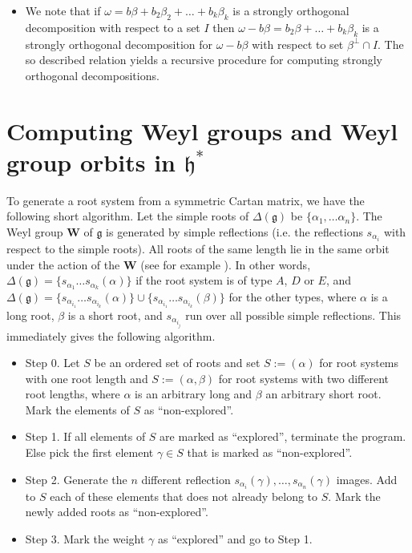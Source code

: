 \documentclass[12pt]{report}
\newcommand{\WW}{\mathbf{W}}
\newcommand{\hh}{\mathfrak{h}}
\newcommand{\gG}{\mathfrak{g}}
\begin{document}
\begin{itemize}
\begin{itemize}
\item We note that if $\omega=b\beta+b_2\beta_2+\dots+b_k\beta_k$ is a strongly orthogonal decomposition with respect to a set $I$ then $\omega-b\beta=b_2\beta+\dots+b_k\beta_k$ is a strongly orthogonal decomposition for $\omega-b\beta$ with respect to set $\beta^\perp\cap I$. The so described relation yields a recursive procedure for computing strongly orthogonal decompositions.
\end{itemize}

\end{itemize}


\section{Computing Weyl groups and Weyl group orbits in $\hh^*$}
To generate a root system from a symmetric Cartan matrix, we have the following short algorithm. Let the simple roots of $\Delta(\gG)$ be $\{\alpha_1,\dots \alpha_n\}$. The Weyl group $\WW$ of $\gG$ is generated by simple reflections (i.e. the reflections $s_{\alpha_i}$ with respect to the simple roots). All roots of the same length lie in the same orbit under the action of the $\WW$ (see for example \cite[\S 10.3, 10.4]{Humphreys}). In other words, $\Delta(\gG)=\{s_{\alpha_1}\dots s_{\alpha_k}(\alpha)\}$ if the root system is of type $A$, $D$ or $E$, and $\Delta(\gG)=\{s_{\alpha_{i_1}}\dots s_{\alpha_{i_k}}(\alpha)\}\cup \{s_{\alpha_{i_1}}\dots s_{\alpha_{i_k}}(\beta)\}$ for the other types, where $\alpha$ is a long root, $\beta$ is a short root, and $s_{\alpha_{i_j}}$ run over all possible simple reflections. This immediately gives the following algorithm.
\begin{itemize}
\item Step 0. Let $S$ be an ordered set of roots and set $S:=(\alpha)$ for root systems with one root length and  $S:=(\alpha,\beta)$ for root systems with two different root lengths, where $\alpha$ is an arbitrary long and $\beta$ an arbitrary short root. Mark the elements of $S$ as ``non-explored''.
\item Step 1. If all elements of $S$ are marked as ``explored'', terminate the program. Else pick the first element $\gamma\in S$ that is marked as ``non-explored''.
\item Step 2. Generate the $n$ different reflection $s_{\alpha_i}(\gamma),\dots,s_{\alpha_n}(\gamma)$ images. Add to $S$ each of these elements that does not already belong to $S$. Mark the newly added roots as ``non-explored''.
\item Step 3. Mark the weight $\gamma$ as ``explored'' and go to Step 1.
\end{itemize}
\end{document}
